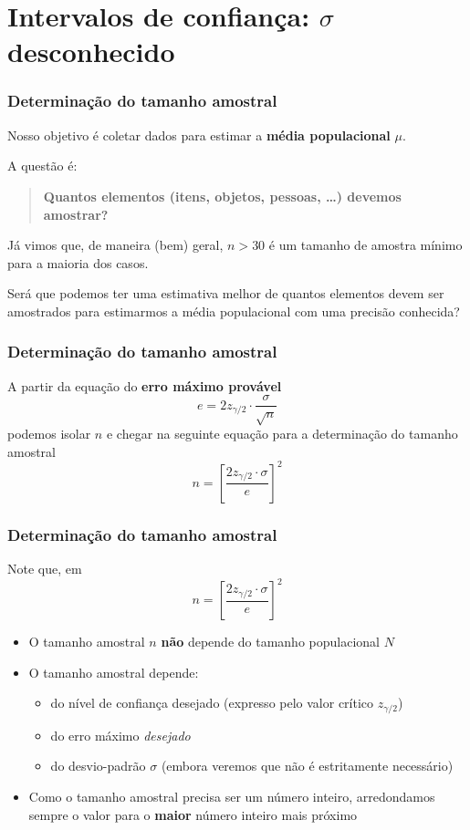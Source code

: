 \documentclass[11pt]{beamer}
\begin{document}
\section{Intervalos de confiança: \(\sigma\) desconhecido}
\begin{frame}
\frametitle{Determinação do tamanho amostral}

Nosso objetivo é coletar dados para estimar a \textbf{média
populacional} \(\mu\).

A questão é:

\begin{quote}
\textbf{Quantos elementos (itens, objetos, pessoas, \ldots{}) devemos
amostrar?}
\end{quote}

Já vimos que, de maneira (bem) geral, \(n>30\) é um tamanho de amostra
mínimo para a maioria dos casos.

Será que podemos ter uma estimativa melhor de quantos elementos devem
ser amostrados para estimarmos a média populacional com uma precisão
conhecida?
\end{frame}

\begin{frame}
\frametitle{Determinação do tamanho amostral}

A partir da equação do \textbf{erro máximo provável} \[
e = 2 z_{\gamma/2} \cdot \frac{\sigma}{\sqrt{n}}
\] podemos isolar \(n\) e chegar na seguinte equação para a determinação
do tamanho amostral \[
n = \left[ \frac{2 z_{\gamma/2} \cdot \sigma}{e} \right]^2
\]
\end{frame}

\begin{frame}
\frametitle{Determinação do tamanho amostral}

Note que, em \[
n = \left[ \frac{2 z_{\gamma/2} \cdot \sigma}{e} \right]^2
\]

\begin{itemize}
\item
  O tamanho amostral \(n\) \textbf{não} depende do tamanho populacional
  \(N\)
\item
  O tamanho amostral depende:

  \begin{itemize}
  \item
    do nível de confiança desejado (expresso pelo valor crítico
    \(z_{\gamma/2}\))
  \item
    do erro máximo \textsl{desejado}
  \item
    do desvio-padrão \(\sigma\) (embora veremos que não é estritamente
    necessário)
  \end{itemize}
\item
  Como o tamanho amostral precisa ser um número inteiro, arredondamos
  sempre o valor para o \textbf{maior} número inteiro mais próximo
\end{itemize}
\end{frame}
\end{document}
